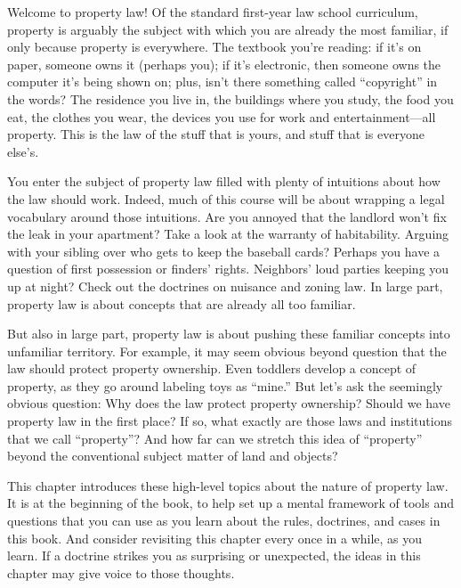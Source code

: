 Welcome to property law! Of the standard first-year law school curriculum,
property is arguably the subject with which you are already the most familiar,
if only because property is everywhere. The textbook you're reading: if it's on
paper, someone owns it (perhaps you); if it's electronic, then someone owns the
computer it's being shown on; plus, isn't there something called ``copyright''
in the words? The residence you live in, the buildings where you study,
the food you eat, the clothes you wear, the devices you use for work and
entertainment---all property. This is the law of the stuff that is yours, and
stuff that is everyone else's.

You enter the subject of property law filled with plenty of intuitions about how
the law should work. Indeed, much of this course will be about wrapping a legal
vocabulary around those intuitions. Are you annoyed that the landlord won't fix
the leak in your apartment? Take a look at the warranty of habitability. Arguing
with your sibling over who gets to keep the baseball cards? Perhaps you have a
question of first possession or finders' rights. Neighbors' loud parties keeping
you up at night? Check out the doctrines on nuisance and zoning law. In large
part, property law is about concepts that are already all too familiar.

But also in large part, property law is about pushing these familiar concepts
into unfamiliar territory. For example, it may seem obvious beyond question that
the law should protect property ownership.
Even toddlers develop a concept of property, as they go around
labeling toys as ``mine.'' But let's ask the seemingly obvious question: Why
does the law protect property ownership? Should we have property law in the
first place? If so, what exactly are those laws and institutions that we
call ``property''? And how far can we stretch this idea of ``property'' beyond
the conventional subject matter of land and objects?

This chapter introduces these high-level topics about the nature of property
law. It is at the beginning of the book, to help set up a mental framework of
tools and questions that you can use as you learn about the rules, doctrines,
and cases in this book. And consider revisiting this chapter every once in a
while, as you learn. If a doctrine strikes you as surprising or unexpected,
the ideas in this chapter may give voice to those thoughts.
